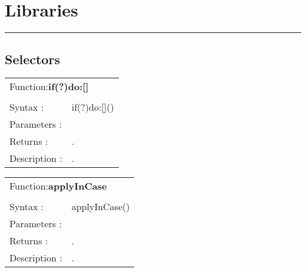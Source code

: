 \documentclass[a4paper,11pt,oneside]{article}
\begin{document}
\vspace{1cm}
\sffamily
\newpage
\section{Libraries}


\vspace{5mm}
\rule{16cm}{2pt}
\subsection{Selectors}



\vspace{2mm}
\hline
\vspace{1mm}
\begin{tabular}{p{2.5cm} p{12cm}}
   
    \multicolumn{2}{l}{Function:\textbf{if(?)do:[]}}\\
	 & \\
    Syntax : & if(?)do:[]()\\
    Parameters : & 
\begin{itemize}

\end{itemize}\\
	
    Returns : & .\\
    Description : & .\\
\end{tabular}


\vspace{2mm}
\hline
\vspace{1mm}
\begin{tabular}{p{2.5cm} p{12cm}}
   
    \multicolumn{2}{l}{Function:\textbf{applyInCase}}\\
	 & \\
    Syntax : & applyInCase()\\
    Parameters : & 
\begin{itemize}

\end{itemize}\\
	
    Returns : & .\\
    Description : & .\\
\end{tabular}
\end{document}
